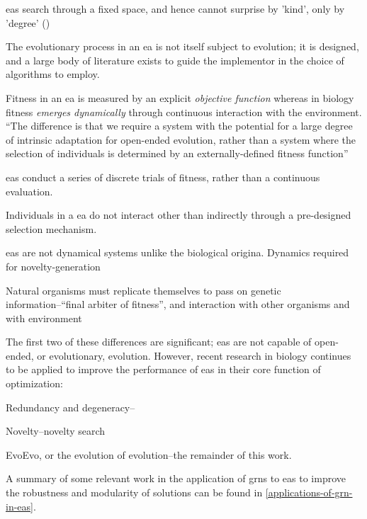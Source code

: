 \begin{compactitem}
\item \Glspl{ea} search through a fixed space, and hence cannot surprise by 'kind', only by 'degree' (\eg \parencite{Nellis2014})
\item The evolutionary process in an \gls{ea} is not itself subject to evolution; it is designed, and a large body of literature exists to guide the implementor in the choice of algorithms to employ.
\item Fitness in an \gls{ea} is measured by an explicit \emph{objective function} whereas in biology fitness \emph{emerges dynamically} through continuous interaction with the environment. ``The difference is that we require a system with the potential for a large degree of intrinsic adaptation for open-ended evolution, rather than a system where the selection of individuals is determined by an externally-defined fitness function'' \parencite{Taylor2001}
\item \Glspl{ea} conduct a series of discrete trials of fitness, rather than a continuous evaluation.
\item Individuals in a \gls{ea} do not interact other than indirectly through a pre-designed selection mechanism.
\item \Glspl{ea} are not dynamical systems unlike the biological origina. Dynamics required for novelty-generation \parencite{Nellis2012}
\item Natural organisms must replicate themselves to pass on genetic information--``final arbiter of fitness'', and interaction with other organisms and with environment \parencite{Ofria2004}
\end{compactitem}

The first two of these differences are significant; \glspl{ea} are not capable of open-ended, or evolutionary, evolution. However, recent research in biology continues to be applied to improve the performance of \glspl{ea} in their core function of optimization:
\begin{compactitem}
	\item Redundancy and degeneracy--\eg \parencite{Whitacre:2010qy}
	\item Novelty--\eg novelty search \parencite{Lehman:2008cr}
	\item EvoEvo, or the evolution of evolution--\eg the remainder of this work.
\end{compactitem}

A summary of some relevant work in the application of \glspl{grn} to \glspl{ea} to improve the robustness and modularity of solutions can be found in \cref{applications-of-grn-in-eas}.

